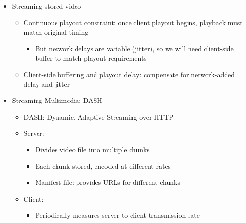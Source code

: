 \begin{itemize}
\begin{itemize}
    \end{itemize}

  \item Streaming stored video

    \begin{itemize}

      \item Continuous playout constraint: once client playout begins, playback must match original timing

        \begin{itemize}

          \item But network delays are variable (jitter), so we will need client-side buffer to match playout requirements

        \end{itemize}

      \item Client-side buffering and playout delay: compensate for network-added delay and jitter

    \end{itemize}

  \item Streaming Multimedia: DASH

    \begin{itemize}

      \item DASH: Dynamic, Adaptive Streaming over HTTP

      \item Server:

        \begin{itemize}

          \item Divides video file into multiple chunks

          \item Each chunk stored, encoded at different rates

          \item Manifest file: provides URLs for different chunks

        \end{itemize}

      \item Client:

        \begin{itemize}

          \item Periodically measures server-to-client transmission rate


\end{itemize}
\end{itemize}
\end{itemize}
